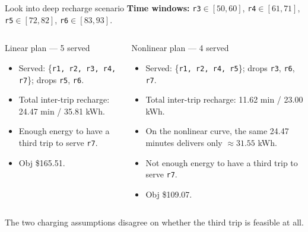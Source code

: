 \documentclass[10pt,aspectratio=169]{beamer}
\begin{document}
\begin{frame}{Look into deep recharge scenario}
\textbf{Time windows:} \texttt{r3}$\in[50,60]$, \texttt{r4}$\in[61,71]$, \texttt{r5}$\in[72,82]$, \texttt{r6}$\in[83,93]$. 

\vspace{6pt}
\begin{columns}[T,onlytextwidth]
\begin{block}{Linear plan --- 5 served}
\small
\begin{itemize}\itemsep1pt
  \item Served: \{\texttt{r1, r2, r3, r4, r7}\}; drops \texttt{r5}, \texttt{r6}.
  \item Total inter-trip recharge: \alert{24.47 min / 35.81 kWh}.
  \item Enough energy to have a third trip to serve \texttt{r7}.
  \item Obj \$165.51.
\end{itemize}
\end{block}

\begin{block}{Nonlinear plan --- 4 served}
\small
\begin{itemize}\itemsep1pt
  \item Served: \{\texttt{r1, r2, r4, r5}\}; drops \texttt{r3}, \texttt{r6}, \texttt{r7}.
  \item Total inter-trip recharge: \alert{11.62 min / 23.00 kWh}.
  \item On the nonlinear curve, the same 24.47 minutes delivers only $\approx 31.55$ kWh. 
  \item Not enough energy to have a third trip to serve \texttt{r7}. 
  \item{Obj \$109.07}.
\end{itemize}
\end{block}
\end{columns}

\vspace{6pt}
\begin{block}{}
The two charging assumptions disagree on whether the third trip is feasible at all. 
\end{block}
\end{frame}
\end{document}
